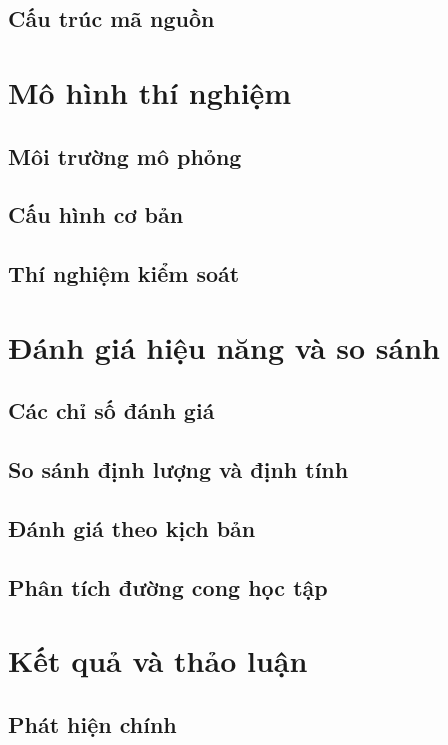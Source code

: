 \documentclass[12pt,a4paper,oneside]{report}
\begin{document}
\section{Cấu trúc mã nguồn}

\chapter{Mô hình thí nghiệm}
\section{Môi trường mô phỏng}
\section{Cấu hình cơ bản}
\section{Thí nghiệm kiểm soát}

\chapter{Đánh giá hiệu năng và so sánh}
\section{Các chỉ số đánh giá}
\section{So sánh định lượng và định tính}
\section{Đánh giá theo kịch bản}
\section{Phân tích đường cong học tập}

\chapter{Kết quả và thảo luận}
\section{Phát hiện chính}
\end{document}
